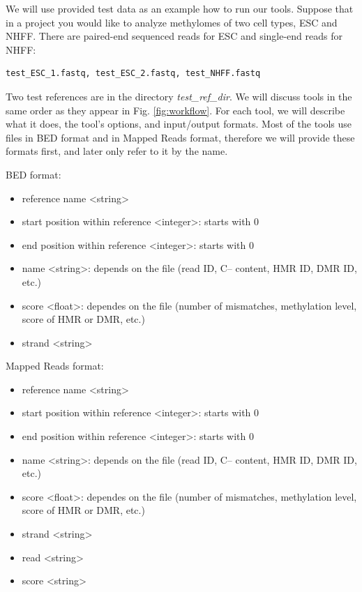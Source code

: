 \documentclass{article}
\begin{document}
We will use provided test data as an example how to run our tools.
 Suppose that in
a project you would like to analyze methylomes of two
cell types, ESC and NHFF. There are paired-end sequenced reads for ESC
and single-end reads for NHFF: 
\begin{verbatim}
test_ESC_1.fastq, test_ESC_2.fastq, test_NHFF.fastq
\end{verbatim}
Two test references are in the directory \textit{test\_ref\_dir}.
We will discuss tools in the same order as they appear in Fig. \ref{fig:workflow}. For each
tool, we will describe what it does, the tool's options, and input/output formats.
Most of the tools use files in BED format and in Mapped Reads format, therefore we will provide these formats first, and 
later only refer to it by the name.


BED format:
\begin{itemize}
\item
reference name \textless string\textgreater
\item
start position within reference \textless integer\textgreater: starts with 0
\item
end position within reference \textless integer\textgreater: starts with 0
\item
name \textless string\textgreater : depends on the file (read ID, C-- content, HMR ID, DMR ID, etc.)
\item
score \textless float\textgreater : dependes on the file (number of mismatches, methylation level, score of HMR or DMR, etc.)
\item
strand \textless string\textgreater
\end{itemize}

Mapped Reads format:
\begin{itemize}
\item
reference name \textless string\textgreater
\item
start position within reference \textless integer\textgreater: starts with 0
\item
end position within reference \textless integer\textgreater: starts with 0
\item
name \textless string\textgreater : depends on the file (read ID, C-- content, HMR ID, DMR ID, etc.)
\item
score \textless float\textgreater : dependes on the file (number of mismatches, methylation level, score of HMR or DMR, etc.)
\item
strand \textless string\textgreater
\item
read \textless string\textgreater
\item
score \textless string\textgreater
\end{itemize}
\end{document}
